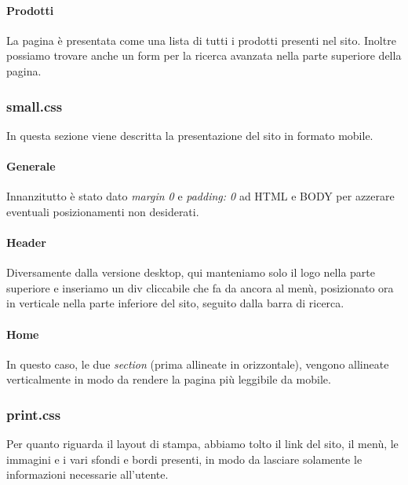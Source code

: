 \paragraph{Prodotti} \Spazio
La pagina è presentata come una lista di tutti i prodotti presenti nel sito.\newline
Inoltre possiamo trovare anche un form per la ricerca avanzata nella parte superiore della pagina. 


\subsubsection{small.css}
In questa sezione viene descritta la presentazione del sito in formato mobile.

\paragraph{Generale} \Spazio
Innanzitutto è stato dato \emph{margin 0} e \emph{padding: 0} ad HTML e BODY per azzerare eventuali posizionamenti non desiderati. 

\paragraph{Header} \Spazio
Diversamente dalla versione desktop, qui manteniamo solo il logo nella parte superiore e inseriamo un div cliccabile che fa da ancora al menù, posizionato ora in verticale nella parte inferiore del sito, seguito dalla barra di ricerca.\newline


\paragraph{Home} \Spazio
In questo caso, le due \emph{section} (prima allineate in orizzontale), vengono allineate verticalmente in modo da rendere la pagina più leggibile da mobile.


\subsubsection{print.css}
Per quanto riguarda il layout di stampa, abbiamo tolto il link del sito, il menù, le immagini e i vari sfondi e bordi presenti, in modo da lasciare solamente le informazioni necessarie all'utente.
